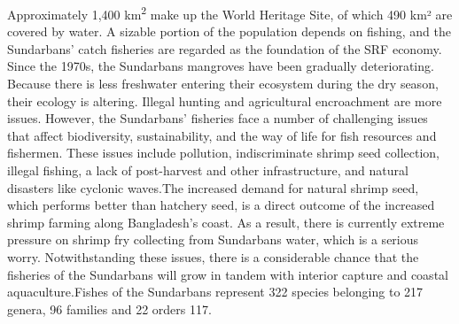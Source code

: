 \documentclass[final,5p,times,twocolumn,authoryear]{elsarticle}
\begin{document}
Approximately 1,400 km\textsuperscript{2} make up the World Heritage Site, of which 490 km² are covered by water. A sizable portion of the population depends on fishing, and the Sundarbans' catch fisheries are regarded as the foundation of the SRF economy. 
Since the 1970s, the Sundarbans mangroves have been gradually deteriorating. Because there is less freshwater entering their ecosystem during the dry season, their ecology is altering. Illegal hunting and agricultural encroachment are more issues. However, the Sundarbans' fisheries face a number of challenging issues that affect biodiversity, sustainability, and the way of life for fish resources and fishermen. These issues include pollution, indiscriminate shrimp seed collection, illegal fishing, a lack of post-harvest and other infrastructure, and natural disasters like cyclonic waves.The increased demand for natural shrimp seed, which performs better than hatchery seed, is a direct outcome of the increased shrimp farming along Bangladesh's coast. As a result, there is currently extreme pressure on shrimp fry collecting from Sundarbans water, which is a serious worry. Notwithstanding these issues, there is a considerable chance that the fisheries of the Sundarbans will grow in tandem with interior capture and coastal aquaculture\cite{book}.Fishes of the Sundarbans represent 322 species belonging to 217 genera, 96 families and 22 orders 
117\cite{article}.\vspace{0.5cm}
\end{document}
